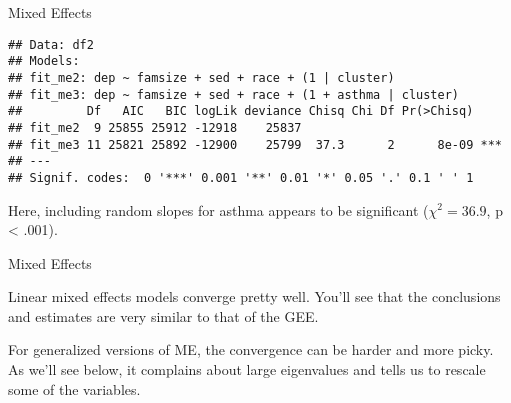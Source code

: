 \begin{frame}[fragile]{Mixed Effects}

\footnotesize

\begin{Shaded}
\begin{Highlighting}[]
 \NormalTok{)}
\end{Highlighting}
\end{Shaded}

\begin{verbatim}
## Data: df2
## Models:
## fit_me2: dep ~ famsize + sed + race + (1 | cluster)
## fit_me3: dep ~ famsize + sed + race + (1 + asthma | cluster)
##         Df   AIC   BIC logLik deviance Chisq Chi Df Pr(>Chisq)    
## fit_me2  9 25855 25912 -12918    25837                            
## fit_me3 11 25821 25892 -12900    25799  37.3      2      8e-09 ***
## ---
## Signif. codes:  0 '***' 0.001 '**' 0.01 '*' 0.05 '.' 0.1 ' ' 1
\end{verbatim}

Here, including random slopes for asthma appears to be significant
(\(\chi^2 = 36.9\), p \textless{} .001).

\end{frame}

\begin{frame}{Mixed Effects}

Linear mixed effects models converge pretty well. You'll see that the
conclusions and estimates are very similar to that of the GEE.

For generalized versions of ME, the convergence can be harder and more
picky. As we'll see below, it complains about large eigenvalues and
tells us to rescale some of the variables.

\end{frame}

